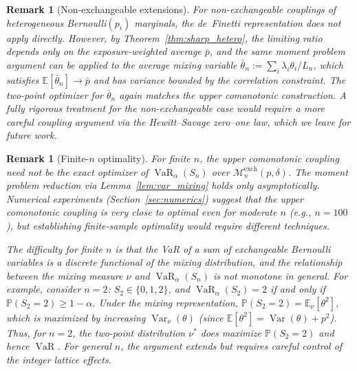\documentclass[11pt]{article}
\newtheorem{remark}[theorem]{Remark}
\theoremstyle{definition}
\newcommand{\E}{\mathbb{E}}
\newcommand{\Var}{\operatorname{Var}}
\newcommand{\VaR}{\operatorname{VaR}}
\newcommand{\PP}{\mathbb{P}}
\newcommand{\1}{\mathbf{1}}
\newcommand{\calM}{\mathcal{M}}
\begin{document}
\begin{remark}[Non-exchangeable extensions]\label{rem:non_exch}
For non-exchangeable couplings of heterogeneous Bernoulli$(p_i)$ marginals, the de~Finetti representation does not apply directly. However, by Theorem~\ref{thm:sharp_hetero}, the limiting ratio depends only on the exposure-weighted average $\bar{p}$, and the same moment problem argument can be applied to the average mixing variable $\bar{\theta}_n := \sum_i \lambda_i \theta_i / L_n$, which satisfies $\E[\bar{\theta}_n] \to \bar{p}$ and has variance bounded by the correlation constraint. The two-point optimizer for $\bar{\theta}_n$ again matches the upper comonotonic construction. A fully rigorous treatment for the non-exchangeable case would require a more careful coupling argument via the Hewitt--Savage zero--one law, which we leave for future work.
\end{remark}

\begin{remark}[Finite-$n$ optimality]\label{rem:finite_n}
For finite $n$, the upper comonotonic coupling need not be the exact optimizer of $\VaR_\alpha(S_n)$ over $\calM_n^{\mathrm{exch}}(p,\delta)$. The moment problem reduction via Lemma~\ref{lem:var_mixing} holds only asymptotically. Numerical experiments (Section~\ref{sec:numerics}) suggest that the upper comonotonic coupling is very close to optimal even for moderate $n$ (e.g., $n = 100$), but establishing finite-sample optimality would require different techniques.

The difficulty for finite $n$ is that the VaR of a sum of exchangeable Bernoulli variables is a discrete functional of the mixing distribution, and the relationship between the mixing measure $\nu$ and $\VaR_\alpha(S_n)$ is not monotone in general. For example, consider $n = 2$: $S_2 \in \{0, 1, 2\}$, and $\VaR_\alpha(S_2) = 2$ if and only if $\PP(S_2 = 2) \geq 1 - \alpha$. Under the mixing representation, $\PP(S_2 = 2) = \E_\nu[\theta^2]$, which is maximized by increasing $\Var_\nu(\theta)$ (since $\E[\theta^2] = \Var(\theta) + p^2$). Thus, for $n = 2$, the two-point distribution $\nu^*$ does maximize $\PP(S_2 = 2)$ and hence $\VaR$. For general $n$, the argument extends but requires careful control of the integer lattice effects.
\end{remark}
\end{document}

